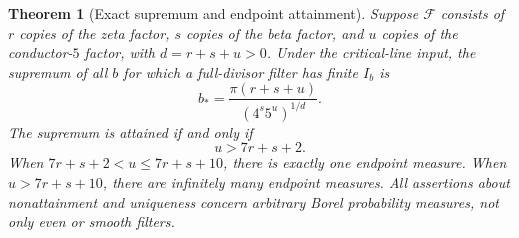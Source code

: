 \documentclass[11pt]{article}
\newtheorem{theorem}{Theorem}[section]
\theoremstyle{remark}\newtheorem{remark}[theorem]{Remark}
\newcommand{\F}{\mathcal F}\newcommand{\dd}{\,\mathrm d}
\begin{document}
\begin{theorem}[Exact supremum and endpoint attainment]\label{thm:examples}
Suppose $\F$ consists of $r$ copies of the zeta factor, $s$ copies of the beta factor, and $u$ copies of the conductor-$5$ factor, with $d=r+s+u>0$. Under the critical-line input, the supremum of all $b$ for which a full-divisor filter has finite $I_b$ is
\[
 b_*=\frac{\pi(r+s+u)}{(4^s5^u)^{1/d}}.
\]
The supremum is attained if and only if
\begin{equation}\label{eq:attain}
 u>7r+s+2.
\end{equation}
When $7r+s+2<u\le7r+s+10$, there is exactly one endpoint measure. When $u>7r+s+10$, there are infinitely many endpoint measures. All assertions about nonattainment and uniqueness concern arbitrary Borel probability measures, not only even or smooth filters.
\end{theorem}
\end{document}
